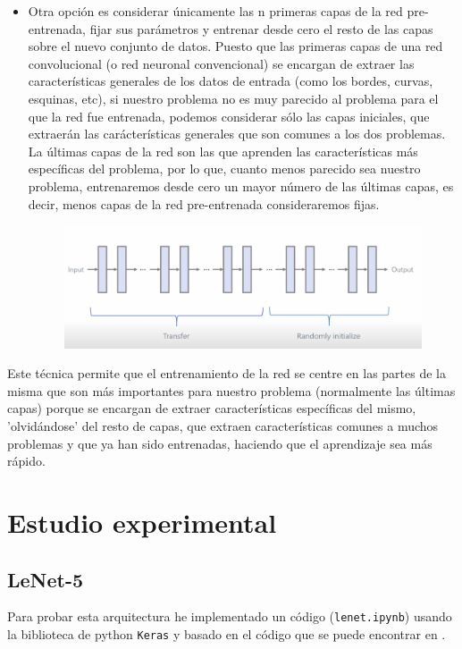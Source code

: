 \documentclass[a4paper,11pt]{article}
\begin{document}
\begin{itemize}
	\item Otra opción es considerar únicamente las n primeras capas de la red pre-entrenada, fijar sus parámetros y entrenar desde cero el resto de las capas sobre el nuevo conjunto de datos. Puesto que las primeras capas de una red convolucional (o red neuronal convencional) se encargan de extraer las características generales de los datos de entrada (como los bordes, curvas, esquinas, etc), si nuestro problema no es muy parecido al problema para el que la red fue entrenada, podemos considerar sólo las capas iniciales, que extraerán las carácterísticas generales que son comunes a los dos problemas. La últimas capas de la red son las que aprenden las características más específicas del problema, por lo que, cuanto menos parecido sea nuestro problema, entrenaremos desde cero un mayor número de las últimas capas, es decir, menos capas de la red pre-entrenada consideraremos fijas. 
	\begin{figure}[H]
		\centering
		\includegraphics[width=0.9\linewidth]{img/tf2}
		\caption{}
		\label{fig:tf2}
	\end{figure}

\end{itemize}
 
 Este técnica permite que el entrenamiento de la red se centre en las partes de la misma que son más importantes para nuestro problema (normalmente las últimas capas) porque se encargan de extraer características específicas del mismo, 'olvidándose' del resto de capas, que extraen características comunes a muchos problemas y que ya han sido entrenadas, haciendo que el aprendizaje sea más rápido. 

\newpage
\section{Estudio experimental}
\subsection{LeNet-5}
Para probar esta arquitectura he implementado un código (\texttt{lenet.ipynb}) usando la biblioteca de python \texttt{Keras} y basado en el código que se puede encontrar en \cite{10}. 
\end{document}
